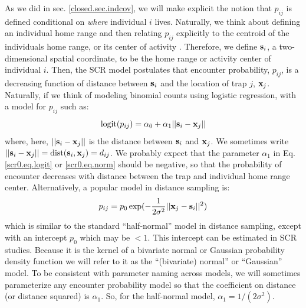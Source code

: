 As we did in sec. \ref{closed.sec.indcov}, we will make explicit the
notion that $p_{ij}$ is defined conditional on {\it where} individual
$i$ lives. Naturally, we think about defining an individual home range
and then relating $p_{ij}$ explicitly to the centroid of the
individuals home range, or its center of activity \citep{efford:2004,
  borchers_efford:2008, royle_young:2008}.  Therefore, we define ${\bf
  s}_{i}$, a two-dimensional spatial coordinate, to be the home range
or activity
center of individual $i$. Then, the SCR model postulates that
encounter probability, $p_{ij}$, is a decreasing function of distance
between ${\bf s}_{i}$ and the location of trap $j$, ${\bf x}_{j}$.
Naturally, if we think of modeling binomial counts using logistic
regression, with a model for $p_{ij}$ such as:
\begin{equation}
	\mbox{logit}(p_{ij}) = \alpha_{0} + \alpha_1 ||{\bf s}_{i}-{\bf x}_{j} ||
\label{scr0.eq.logit}
\end{equation}
where, here, $||{\bf s}_{i}-{\bf x}_{j}||$ is the distance between
${\bf s}_{i}$ and ${\bf x}_{j}$. We sometimes write $||{\bf
  s}_{i}-{\bf x}_{j}|| = \mbox{dist}({\bf s}_{i},{\bf x}_{j}) =
d_{ij}$.
We probably expect that the parameter $\alpha_{1}$ in
Eq. \ref{scr0.eq.logit} or \ref{scr0.eq.norm} should be negative, so
that the probability of encounter decreases with distance between the
trap and individual home range center.
Alternatively, a popular model in distance sampling is:
\begin{equation}
p_{ij} = p_{0}\exp(-\frac{1}{2\sigma^{2}}||{\bf x}_{j}-{\bf s}_{i}||^2)
\label{scr0.eq.norm}
\end{equation}
which is similar to the standard ``half-normal'' model in distance
sampling, except with an intercept $p_{0}$ which may be $<1$. This
intercept can be estimated in SCR studies.  Because it is the kernel
of a bivariate normal or Gaussian probability density function we will
refer to it as the ``(bivariate) normal'' or ``Gaussian'' model.  To
be consistent with parameter naming across models, we will sometimes
parameterize any encounter probability model so that the coefficient
on distance (or distance squared) is $\alpha_{1}$. So, for the
half-normal model, $\alpha_{1} = 1/(2\sigma^{2})$.

